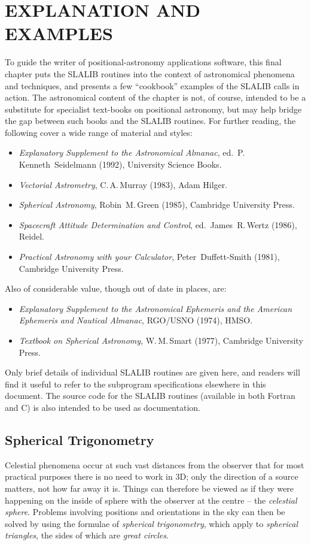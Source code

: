 \documentclass[11pt,twoside,nolof]{starlink}
\begin{document}
\section{EXPLANATION AND EXAMPLES}
To guide the writer of positional-astronomy applications software,
this final chapter puts the SLALIB routines into the context of
astronomical phenomena and techniques, and presents a few
``cookbook'' examples
of the SLALIB calls in action.  The astronomical content of the chapter
is not, of course, intended to be a substitute for specialist text-books on
positional astronomy, but may help bridge the gap between
such books and the SLALIB routines.  For further reading, the following
cover a wide range of material and styles:
\begin{itemize}
\item \textit{Explanatory Supplement to the Astronomical Almanac},
      ed.\ P.\,Kenneth~Seidelmann (1992), University Science Books.
\item \textit{Vectorial Astrometry}, C.\,A.\,Murray (1983), Adam Hilger.
\item \textit{Spherical Astronomy}, Robin~M.\,Green (1985), Cambridge
      University Press.
\item \textit{Spacecraft Attitude Determination and Control},
      ed.\ James~R.\,Wertz (1986), Reidel.
\item \textit{Practical Astronomy with your Calculator},
      Peter~Duffett-Smith (1981), Cambridge University Press.
\end{itemize}
Also of considerable value, though out of date in places, are:
\begin{itemize}
\item \textit{Explanatory Supplement to the Astronomical Ephemeris
      and the American Ephemeris and Nautical Almanac}, RGO/USNO (1974),
      HMSO.
\item \textit{Textbook on Spherical Astronomy}, W.\,M.\,Smart (1977),
      Cambridge University Press.
\end{itemize}
Only brief details of individual SLALIB routines are given here, and
readers will find it useful to refer to the subprogram specifications
elsewhere in this document.  The source code for the SLALIB routines
(available in both Fortran and C) is also intended to be used as
documentation.

\subsection {Spherical Trigonometry}
Celestial phenomena occur at such vast distances from the
observer that for most practical purposes there is no need to
work in 3D;  only the direction
of a source matters, not how far away it is.  Things can
therefore be viewed as if they were happening
on the inside of sphere with the observer at the centre --
the \textit{celestial sphere}.  Problems involving
positions and orientations in the sky can then be solved by
using the formulae of \textit{spherical trigonometry}, which
apply to \textit{spherical triangles}, the sides of which are
\textit{great circles}.
\end{document}
